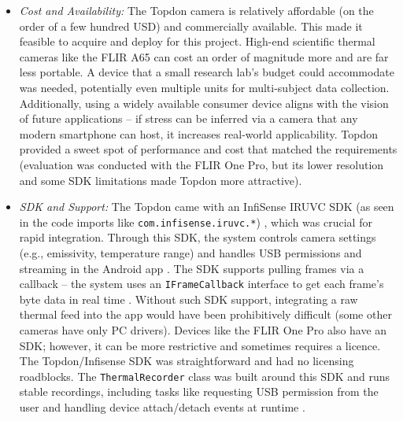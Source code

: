 \begin{itemize}
    \item \emph{Cost and Availability:} The Topdon camera is relatively affordable (on the order of a few hundred USD) and commercially available. This made it feasible to acquire and deploy for this project. High-end scientific thermal cameras like the FLIR A65 can cost an order of magnitude more and are far less portable. A device that a small research lab's budget could accommodate was needed, potentially even multiple units for multi-subject data collection. Additionally, using a widely available consumer device aligns with the vision of future applications -- if stress can be inferred via a camera that any modern smartphone can host, it increases real-world applicability. Topdon provided a sweet spot of performance and cost that matched the requirements (evaluation was conducted with the FLIR One Pro, but its lower resolution and some SDK limitations made Topdon more attractive).
    \item \emph{SDK and Support:} The Topdon came with an InfiSense IRUVC SDK (as seen in the code imports like \texttt{com.infisense.iruvc.*}) \cite{ref16}, which was crucial for rapid integration. Through this SDK, the system controls camera settings (e.g., emissivity, temperature range) and handles USB permissions and streaming in the Android app \cite{ref16}. The SDK supports pulling frames via a callback -- the system uses an \texttt{IFrameCallback} interface to get each frame's byte data in real time \cite{ref16}. Without such SDK support, integrating a raw thermal feed into the app would have been prohibitively difficult (some other cameras have only PC drivers). Devices like the FLIR One Pro also have an SDK; however, it can be more restrictive and sometimes requires a licence. The Topdon/Infisense SDK was straightforward and had no licensing roadblocks. The \texttt{ThermalRecorder} class was built around this SDK and runs stable recordings, including tasks like requesting USB permission from the user and handling device attach/detach events at runtime \cite{ref16}.

\end{itemize}
